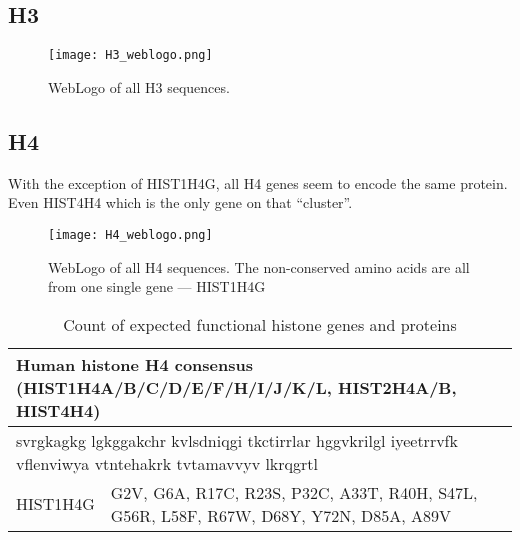 \documentclass[10pt,a4paper,draft]{article}
\newcommand{\rewrite}[2][]{\todo[inline,color=green!40,#1]{#2}}       %
\begin{document}
    \subsection{H3}
      \begin{figure}
        \centering
        \texttt{[image: H3\_weblogo.png]}
        \caption{WebLogo of all H3 sequences.}
        \label{fig:h3-weblogo}
      \end{figure}
    \subsection{H4}
      With the exception of HIST1H4G, all H4 genes seem to encode the same protein. Even HIST4H4 which is the
      only gene on that ``cluster''.
      \begin{figure}
        \centering
        \texttt{[image: H4\_weblogo.png]}
        \caption{WebLogo of all H4 sequences. The non-conserved amino acids are all from one single gene --- HIST1H4G}
        \label{fig:h4-weblogo}
      \end{figure}
      \begin{table}
        \centering
        \begin{tabular}{l | l}
          \multicolumn{2}{l}{Human histone H4 consensus (HIST1H4A/B/C/D/E/F/H/I/J/K/L, HIST2H4A/B, HIST4H4)} \\
          \hline
          \multicolumn{2}{l}{svrgkagkg lgkggakchr kvlsdniqgi tkctirrlar hggvkrilgl iyeetrrvfk vflenviwya vtntehakrk tvtamavvyv lkrqgrtl} \\
          \hline
          HIST1H4G   & G2V, G6A, R17C, R23S, P32C, A33T, R40H, S47L, G56R, L58F, R67W, D68Y, Y72N, D85A, A89V \\
        \end{tabular}
        \caption{Count of expected functional histone genes and proteins}
        \label{tab:histone}
      \end{table}

\end{document}
